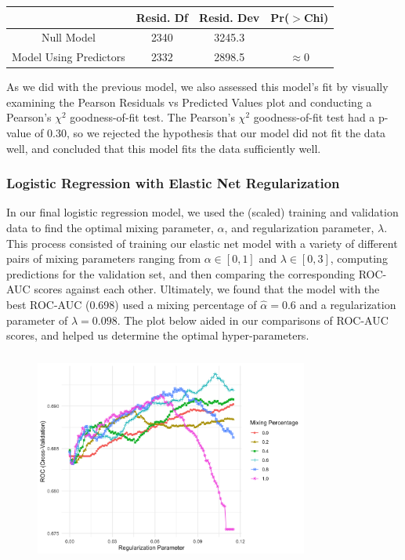 \documentclass[10pt]{article}
\begin{document}
\begin{table}[h!]
\centering
\begin{tabular}{| c | c | c | c | } 
\hline
& Resid. Df & Resid. Dev & Pr($>$Chi) \\ 
\hline
\hline
Null Model & 2340 & 3245.3 & \\
\hline
Model Using Predictors & 2332 & 2898.5 & $\approx 0$\\
\hline  
\end{tabular}
\end{table}

As we did with the previous model, we also assessed this model's fit by visually examining the Pearson Residuals vs Predicted Values plot and conducting a Pearson's $\chi^2$ goodness-of-fit test. The Pearson's $\chi^2$ goodness-of-fit test had a p-value of 0.30, so we rejected the hypothesis that our model did not fit the data well, and concluded that this model fits the data sufficiently well.


\subsubsection*{Logistic Regression with Elastic Net Regularization}

In our final logistic regression model, we used the (scaled) training and validation data to find the optimal mixing parameter, $\alpha$, and regularization parameter, $\lambda$. This process consisted of training our elastic net model with a variety of different pairs of mixing parameters ranging from $\alpha \in [0, 1]$ and $\lambda \in [0, 3]$, computing predictions for the validation set, and then comparing the corresponding ROC-AUC scores against each other. Ultimately, we found that the model with the best ROC-AUC (0.698) used a mixing percentage of $\hat{\alpha} = 0.6$ and a regularization parameter of $\hat{\lambda} = 0.098$. The plot below aided in our comparisons of ROC-AUC scores, and helped us determine the optimal hyper-parameters.


\begin{figure}[ht!]
\centering
\includegraphics[height = 70mm, width=90mm]{elastic_LR_tuning.png}
\end{figure}
\end{document}
